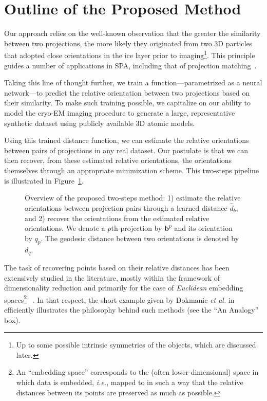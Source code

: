 \section{Outline of the Proposed Method}
\label{sec:outline}

Our approach relies on the well-known observation that the greater the similarity between two projections, the more likely they originated from two 3D particles that adopted close orientations in the ice layer prior to imaging\footnote{Up to some possible intrinsic symmetries of the objects, which are discussed later.}. This principle guides a number of applications in SPA, including that of projection matching~\cite{penczek1994ribosome}.

Taking this line of thought further, we train a function---parametrized as a neural network---to predict the relative orientation between two projections based on their similarity. To make such training possible, we capitalize on our ability to model the cryo-EM imaging procedure to generate a large, representative synthetic dataset using publicly available 3D atomic models.

Using this trained distance function, we can estimate the relative orientations between pairs of projections in any real dataset. Our postulate is that we can then recover, from these estimated relative orientations, the orientations themselves through an appropriate minimization scheme. This two-steps pipeline is illustrated in Figure~\ref{fig:overview-pipeline}. \\

\begin{figure}[h!]
    \center
    \caption{Overview of the proposed two-steps method: 1) estimate the relative orientations between projection pairs through a learned distance $\widehat{d}_b$, and 2) recover the orientations from the estimated relative orientations. We denote a $p$th projection by $\mathbf{b}^p$ and its orientation by $q_p$. The geodesic distance between two orientations is denoted by $d_q$.}
    \label{fig:overview-pipeline}
\end{figure}

The task of recovering points based on their relative distances has been extensively studied in the literature, mostly within the framework of dimensionality reduction and primarily for the case of \textit{Euclidean} embedding spaces\footnote{An ``embedding space'' corresponds to the (often lower-dimensional) space in which data is embedded, \textit{i.e.}, mapped to in such a way that the relative distances between its points are preserved as much as possible.}~\cite{belkin2003laplacian,kruskal1978multidimensional, maaten2008visualizing, mcinnes2018umap,dokmanic2015euclidean} . In that respect, the short example given by Dokmanic \textit{et al.} in~\cite{dokmanic2015euclidean} efficiently illustrates the philosophy behind such methods (see the ``An Analogy'' box). \\

